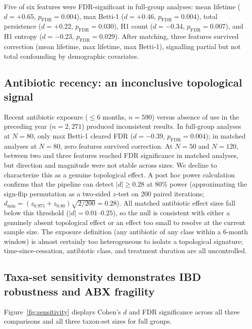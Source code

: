 Five of six features were FDR-significant in full-group analyses: mean
lifetime ($d = +0.65$, $p_\text{FDR} = 0.004$), max Betti-1
($d = +0.46$, $p_\text{FDR} = 0.004$), total persistence
($d = +0.22$, $p_\text{FDR} = 0.030$), H1 count ($d = -0.34$,
$p_\text{FDR} = 0.007$), and H1 entropy ($d = -0.23$,
$p_\text{FDR} = 0.029$).
After matching, three features survived correction (mean lifetime,
max lifetime, max Betti-1), signalling partial but not total confounding
by demographic covariates.

\subsection{Antibiotic recency: an inconclusive topological signal}
\label{subsec:abx_results}

Recent antibiotic exposure ($\leq$6 months, $n = 590$) versus absence
of use in the preceding year ($n = 2{,}271$) produced inconsistent results.
In full-group analyses at $N = 80$, only max Betti-1 cleared FDR
($d = -0.39$, $p_\text{FDR} = 0.004$); in matched analyses at $N = 80$,
zero features survived correction.
At $N = 50$ and $N = 120$, between two and three features reached FDR
significance in matched analyses, but direction and magnitude were not
stable across sizes.
We decline to characterize this as a genuine topological effect.
A post hoc power calculation confirms that the pipeline can detect
$|d| \geq 0.28$ at 80\% power (approximating the sign-flip permutation
as a two-sided $z$-test on 200 paired iterations; $d_{\min} = (z_{0.975} +
z_{0.80}) \sqrt{2/200} = 0.28$).
All matched antibiotic effect sizes fall below this threshold ($|d| = 0.01$--$0.25$),
so the null is consistent with either a genuinely absent topological effect
or an effect too small to resolve at the current sample size.
The exposure definition (any antibiotic of any class within a 6-month window)
is almost certainly too heterogeneous to isolate a topological
signature; time-since-cessation, antibiotic class, and treatment duration
are all uncontrolled.

\subsection{Taxa-set sensitivity demonstrates IBD robustness and ABX fragility}
\label{subsec:sensitivity}

Figure~\ref{fig:sensitivity} displays Cohen's $d$ and FDR significance
across all three comparisons and all three taxon-set sizes for full groups.

